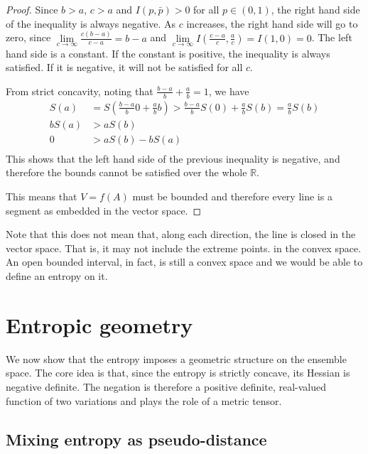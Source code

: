 \begin{mathSection}
\begin{proof}
	Since $b > a$, $c > a$ and $I(p,\bar{p}) > 0$ for all $p \in (0,1)$, the right hand side of the inequality is always negative. As $c$ increases, the right hand side will go to zero, since $\lim\limits_{c\to \infty}\frac{c(b-a)}{c-a} = b-a$ and $\lim\limits_{c\to \infty} I\left(\frac{c-a}{c}, \frac{a}{c}\right) = I(1,0) = 0$. The left hand side is a constant. If the constant is positive, the inequality is always satisfied. If it is negative, it will not be satisfied for all $c$.
	
	From strict concavity, noting that $\frac{b-a}{b} + \frac{a}{b} = 1$, we have
	\begin{equation}
		\begin{aligned}
			S(a) &= S\left(\frac{b-a}{b} 0 + \frac{a}{b} b\right) > \frac{b-a}{b} S(0) + \frac{a}{b} S(b) = \frac{a}{b} S(b)\\
			b S(a) &> a S(b)  \\
			0 &> a S(b) - b S(a)\\
		\end{aligned}
	\end{equation}
	This shows that the left hand side of the previous inequality is negative, and therefore the bounds cannot be satisfied over the whole $\mathbb{R}$.
	
	This means that $V = f(A)$ must be bounded and therefore every line is a segment as embedded in the vector space.
\end{proof}

\begin{remark}
	Note that this does not mean that, along each direction, the line is closed in the vector space. That is, it may not include the extreme points. in the convex space. An open bounded interval, in fact, is still a convex space and we would be able to define an entropy on it.
\end{remark}
\end{mathSection}

\section{Entropic geometry}

We now show that the entropy imposes a geometric structure on the ensemble space. The core idea is that, since the entropy is strictly concave, its Hessian is negative definite. The negation is therefore a positive definite, real-valued function of two variations and plays the role of a metric tensor.

\subsection{Mixing entropy as pseudo-distance}

